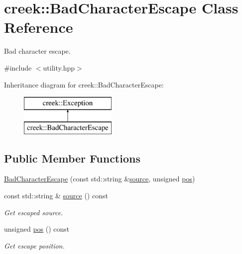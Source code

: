 \hypertarget{classcreek_1_1_bad_character_escape}{}\section{creek\+:\+:Bad\+Character\+Escape Class Reference}
\label{classcreek_1_1_bad_character_escape}


Bad character escape.  




{\ttfamily \#include $<$utility.\+hpp$>$}

Inheritance diagram for creek\+:\+:Bad\+Character\+Escape\+:\begin{figure}[H]
\begin{center}
\leavevmode
\includegraphics[height=2.000000cm]{classcreek_1_1_bad_character_escape}
\end{center}
\end{figure}
\subsection*{Public Member Functions}
{\bf }\par
\begin{DoxyCompactItemize}
\item 
\hyperlink{classcreek_1_1_bad_character_escape_ab04bc2459527a248adb8cdca1605e7e8}{Bad\+Character\+Escape} (const std\+::string \&\hyperlink{classcreek_1_1_bad_character_escape_a801f3c5734341792bfd8088510270040}{source}, unsigned \hyperlink{classcreek_1_1_bad_character_escape_a2dfe21b5fbf95cd50fff406d34ff2a9d}{pos})
\item 
const std\+::string \& \hyperlink{classcreek_1_1_bad_character_escape_a801f3c5734341792bfd8088510270040}{source} () const \hypertarget{classcreek_1_1_bad_character_escape_a801f3c5734341792bfd8088510270040}{}\label{classcreek_1_1_bad_character_escape_a801f3c5734341792bfd8088510270040}

\begin{DoxyCompactList}\small\item\em Get escaped source. \end{DoxyCompactList}\item 
unsigned \hyperlink{classcreek_1_1_bad_character_escape_a2dfe21b5fbf95cd50fff406d34ff2a9d}{pos} () const \hypertarget{classcreek_1_1_bad_character_escape_a2dfe21b5fbf95cd50fff406d34ff2a9d}{}\label{classcreek_1_1_bad_character_escape_a2dfe21b5fbf95cd50fff406d34ff2a9d}

\begin{DoxyCompactList}\small\item\em Get escape position. \end{DoxyCompactList}\end{DoxyCompactItemize}

